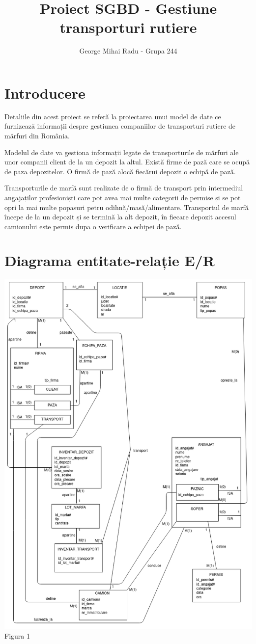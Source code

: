 \documentclass[12pt, a4paper]{article}
\title{Proiect SGBD - Gestiune transporturi rutiere}
\author{George Mihai Radu - Grupa 244}
\date{}
\begin{document}
\maketitle

\newpage
\section{Introducere}
\quad \par
Detaliile din acest proiect se referă la proiectarea unui model de date ce furnizează informații despre gestiunea companiilor de transporturi rutiere de mărfuri din România.

Modelul de date va gestiona informații legate de transporturile de mărfuri ale unor companii client de la un depozit la altul. Există firme de pază care se ocupă de paza depozitelor. O firmă de pază alocă fiecărui depozit o echipă de pază.

Transporturile de marfă sunt realizate de o firmă de transport prin intermediul angajaților profesioniști care pot avea mai multe categorii de permise și se pot opri la mai multe popasuri petru odihnă/masă/alimentare. Transportul de marfă începe de la un depozit și se termină la alt depozit, în fiecare depozit accesul camionului este permis dupa o verificare a echipei de pază.

\newpage
\section{Diagrama entitate-relație E/R}
\includegraphics[width=\textwidth]{_diagrama_er.png}
\label{Figura 1}
\centering Figura 1
\end{document}

